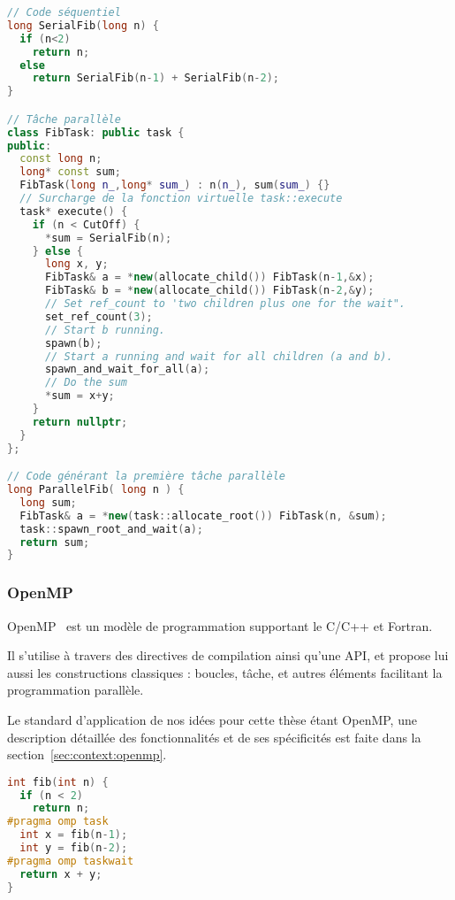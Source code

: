 \begin{lstlisting}[language=c++,caption=Fibonacci exprimé en TBB,label=lst:context:tbb,basicstyle=\scriptsize]
// Code séquentiel
long SerialFib(long n) {
  if (n<2)
    return n;
  else
    return SerialFib(n-1) + SerialFib(n-2);
}

// Tâche parallèle
class FibTask: public task {
public:
  const long n;
  long* const sum;
  FibTask(long n_,long* sum_) : n(n_), sum(sum_) {}
  // Surcharge de la fonction virtuelle task::execute
  task* execute() {
    if (n < CutOff) {
      *sum = SerialFib(n);
    } else {
      long x, y;
      FibTask& a = *new(allocate_child()) FibTask(n-1,&x);
      FibTask& b = *new(allocate_child()) FibTask(n-2,&y);
      // Set ref_count to 'two children plus one for the wait".
      set_ref_count(3);
      // Start b running.
      spawn(b);
      // Start a running and wait for all children (a and b).
      spawn_and_wait_for_all(a);
      // Do the sum
      *sum = x+y;
    }
    return nullptr;
  }
};

// Code générant la première tâche parallèle
long ParallelFib( long n ) {
  long sum;
  FibTask& a = *new(task::allocate_root()) FibTask(n, &sum);
  task::spawn_root_and_wait(a);
  return sum;
}
\end{lstlisting}

\subsubsection{OpenMP}

OpenMP~\cite{openmp45} est un modèle de programmation supportant le C/C++ et Fortran.

Il s'utilise à travers des directives de compilation ainsi qu'une API, et propose lui aussi les constructions classiques : boucles, tâche, et autres éléments facilitant la programmation parallèle.

Le standard d'application de nos idées pour cette thèse étant OpenMP, une description détaillée des fonctionnalités et de ses spécificités est faite dans la section~\ref{sec:context:openmp}.

\begin{lstlisting}[language=c++,caption=Fibonacci exprimé en OpenMP,label=lst:context:openmp,basicstyle=\scriptsize]
int fib(int n) {
  if (n < 2)
    return n;
#pragma omp task
  int x = fib(n-1);
  int y = fib(n-2);
#pragma omp taskwait
  return x + y;
}
\end{lstlisting}


